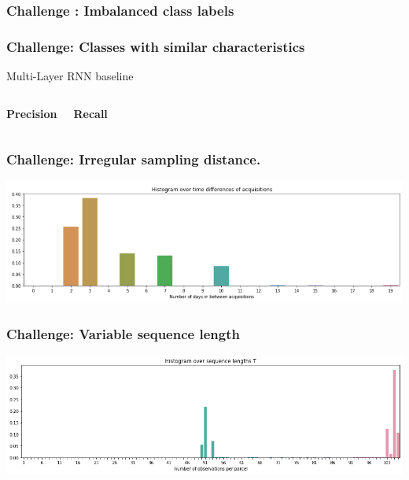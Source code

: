 \documentclass[%
  aspectratio=169,
  9pt,
  USenglish,
  titlegraphic, %
  affiliationintitlepagehead,
  affiliation,
]{beamer}
\begin{document}
\begin{frame}
\frametitle{Challenge : Imbalanced class labels}


\end{frame}

\begin{frame}
\frametitle{Challenge: Classes with similar characteristics}

Multi-Layer RNN baseline

\begin{columns}

\textbf{Precision}


\textbf{Recall}


\end{columns}

\end{frame}

%
%
%
%
%
%
%
%


\begin{frame}
\frametitle{Challenge: Irregular sampling distance.}

\includegraphics[width=\textwidth]{images/days_between_acquisitions}

\end{frame}

\begin{frame}
\frametitle{Challenge: Variable sequence length}
\includegraphics[width=\textwidth]{images/sequencelengths}

\end{frame}
\end{document}
